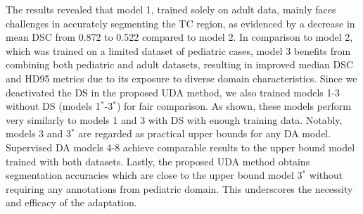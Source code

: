 \documentclass[runningheads]{llncs}
\begin{document}

The results revealed that model 1, trained solely on adult data, mainly faces challenges in accurately segmenting the TC region, as evidenced by a decrease in mean DSC from 0.872 to 0.522 compared to model 2. In comparison to model 2, which was trained on a limited dataset of pediatric cases, model 3 benefits from combining both pediatric and adult datasets, resulting in improved median DSC and HD95 metrics due to its exposure to diverse domain characteristics. Since we deactivated the DS in the proposed UDA method, we also trained models 1-3 without DS (models 1$^*$-3$^*$) for fair comparison. As shown, these models perform very similarly to models 1 and 3 with DS with enough training data. Notably, models 3 and 3$^*$ are regarded as practical upper bounds for any DA model. Supervised DA models 4-8 achieve comparable results to the upper bound model trained with both datasets. Lastly, the proposed UDA method obtains segmentation accuracies which are close to the upper bound model 3$^*$ without requiring any annotations from pediatric domain. This underscores the necessity and efficacy of the adaptation.
\end{document}
